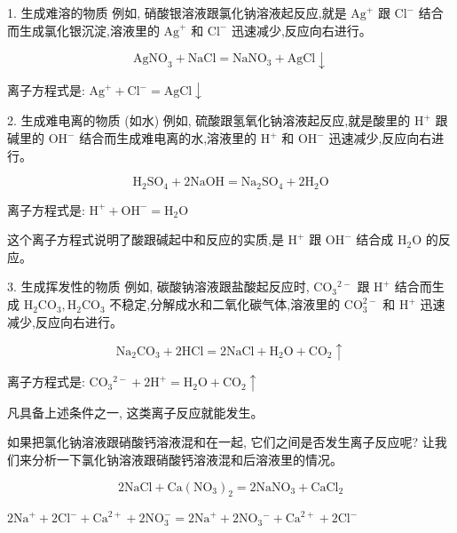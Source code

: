 \documentclass[10pt]{article}
\begin{document}
1. 生成难溶的物质 例如, 硝酸银溶液跟氯化钠溶液起反应,就是 \({\mathrm{{Ag}}}^{ + }\) 跟 \({\mathrm{{Cl}}}^{ - }\) 结合而生成氯化银沉淀,溶液里的 \({\mathrm{{Ag}}}^{ + }\) 和 \({\mathrm{{Cl}}}^{ - }\) 迅速减少,反应向右进行。

\[
{\mathrm{{AgNO}}}_{3} + \mathrm{{NaCl}} = {\mathrm{{NaNO}}}_{3} + \mathrm{{AgCl}} \downarrow
\]

离子方程式是: \({\mathrm{{Ag}}}^{ + } + {\mathrm{{Cl}}}^{ - } = \mathrm{{AgCl}} \downarrow\)

2. 生成难电离的物质 (如水) 例如, 硫酸跟氢氧化钠溶液起反应,就是酸里的 \({\mathrm{H}}^{ + }\) 跟碱里的 \({\mathrm{{OH}}}^{ - }\) 结合而生成难电离的水,溶液里的 \({\mathrm{H}}^{ + }\) 和 \({\mathrm{{OH}}}^{ - }\) 迅速减少,反应向右进行。

\[
{\mathrm{H}}_{2}{\mathrm{{SO}}}_{4} + 2\mathrm{{NaOH}} = {\mathrm{{Na}}}_{2}{\mathrm{{SO}}}_{4} + 2{\mathrm{H}}_{2}\mathrm{O}
\]

离子方程式是: \({\mathrm{H}}^{ + } + {\mathrm{{OH}}}^{ - } = {\mathrm{H}}_{2}\mathrm{O}\)

这个离子方程式说明了酸跟碱起中和反应的实质,是 \({\mathrm{H}}^{ + }\) 跟 \({\mathrm{{OH}}}^{ - }\) 结合成 \({\mathrm{H}}_{2}\mathrm{O}\) 的反应。

3. 生成挥发性的物质 例如, 碳酸钠溶液跟盐酸起反应时, \({\mathrm{{CO}}}_{3}{}^{2 - }\) 跟 \({\mathrm{H}}^{ + }\) 结合而生成 \({\mathrm{H}}_{2}{\mathrm{{CO}}}_{3},{\mathrm{H}}_{2}{\mathrm{{CO}}}_{3}\) 不稳定,分解成水和二氧化碳气体,溶液里的 \({\mathrm{{CO}}}_{3}^{2 - }\) 和 \({\mathrm{H}}^{ + }\) 迅速减少,反应向右进行。

\[
{\mathrm{{Na}}}_{2}{\mathrm{{CO}}}_{3} + 2\mathrm{{HCl}} = 2\mathrm{{NaCl}} + {\mathrm{H}}_{2}\mathrm{O} + {\mathrm{{CO}}}_{2} \uparrow
\]

离子方程式是: \({\mathrm{{CO}}}_{3}{}^{2 - } + 2{\mathrm{H}}^{ + } = {\mathrm{H}}_{2}\mathrm{O} + {\mathrm{{CO}}}_{2} \uparrow\)

凡具备上述条件之一, 这类离子反应就能发生。

如果把氯化钠溶液跟硝酸钙溶液混和在一起, 它们之间是否发生离子反应呢? 让我们来分析一下氯化钠溶液跟硝酸钙溶液混和后溶液里的情况。

\[
2\mathrm{{NaCl}} + \mathrm{{Ca}}{\left( {\mathrm{{NO}}}_{3}\right) }_{2} = 2{\mathrm{{NaNO}}}_{3} + {\mathrm{{CaCl}}}_{2}
\]

\(2{\mathrm{{Na}}}^{ + } + 2{\mathrm{{Cl}}}^{ - } + {\mathrm{{Ca}}}^{2 + } + 2{\mathrm{{NO}}}_{3}^{ - } = 2{\mathrm{{Na}}}^{ + } + 2{\mathrm{{NO}}}_{3}{}^{ - } + {\mathrm{{Ca}}}^{2 + } + 2{\mathrm{{Cl}}}^{ - }\)
\end{document}
